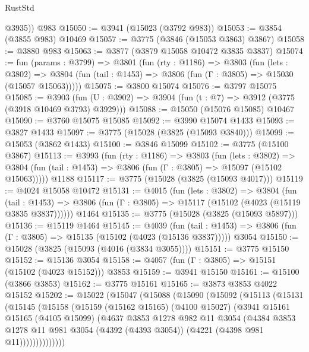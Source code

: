 \begin{lexlean}{RustStd}
\begin{coremodule}
        @3935))
    @983
@15050 := @3941 (@15023 (@3792 @983))
@15053 := @3854 (@3855 @983) @10469
@15057 := @3775 (@3846 (@15053 @3863) @3867)
@15058 := @3880 @983
@15063 := @3877 (@3879 @15058 @10472 @3835 @3837)
@15074 := fun (params : @3799) =>
  @3801
    (fun (rty : @1186) =>
    @3803
      (fun (lets : @3802) =>
      @3804 (fun (tail : @1453) => @3806 (fun (Γ : @3805) => @15030 (@15057 @15063)))))
@15075 := @3800 @15074
@15076 := @3797 @15075
@15085 := @3903
    (fun (U : @3902) => @3904 (fun (t : @7) => @3912 (@3775 (@3918 @10469 @3793) @3929)))
@15088 := @15050 (@15076 @15085) @10467
@15090 := @3760 @15075 @15085
@15092 := @3990 @15074 @1433
@15093 := @3827 @1433
@15097 := @3775 (@15028 (@3825 (@15093 @3840)))
@15099 := @15053 (@3862 @1433)
@15100 := @3846 @15099
@15102 := @3775 (@15100 @3867)
@15113 := @3993
    (fun (rty : @1186) =>
    @3803
      (fun (lets : @3802) =>
      @3804 (fun (tail : @1453) => @3806 (fun (Γ : @3805) => @15097 (@15102 @15063)))))
    @1188
@15117 := @3775 (@15028 (@3825 (@15093 @4017)))
@15119 := @4024 @15058 @10472
@15131 := @4015
    (fun (lets : @3802) =>
    @3804
      (fun (tail : @1453) =>
      @3806 (fun (Γ : @3805) => @15117 (@15102 (@4023 (@15119 @3835 @3837))))))
    @1464
@15135 := @3775 (@15028 (@3825 (@15093 @5897)))
@15136 := @15119 @1464
@15145 := @4039
    (fun (tail : @1453) => @3806 (fun (Γ : @3805) => @15135 (@15102 (@4023 (@15136 @3837)))))
    @3054
@15150 := @15028 (@3825 (@15093 (@4016 (@3834 @3055))))
@15151 := @3775 @15150
@15152 := @15136 @3054
@15158 := @4057 (fun (Γ : @3805) => @15151 (@15102 (@4023 @15152))) @3853
@15159 := @3941 @15150
@15161 := @15100 (@3866 @3853)
@15162 := @3775 @15161
@15165 := @3873 @3853 @4022 @15152
@15202 := @15022
    (@15047
      (@15088
        (@15090
          (@15092
            (@15113
              (@15131
                (@15145
                  (@15158
                    (@15159
                      (@15162 @15165)
                      (@4100 @15027)
                      (@3941
                        @15161
                        @15165
                        (@4105 @15099)
                        (@4637
                          @3853
                          @1278
                          @982
                          @11
                          @3054
                          (@4384
                            @3853
                            @1278
                            @11
                            @981
                            @3054
                            (@4392 (@4393 @3054))
                            (@4221 (@4398 @981 @11))))))))))))))

\end{coremodule}
\end{lexlean}
